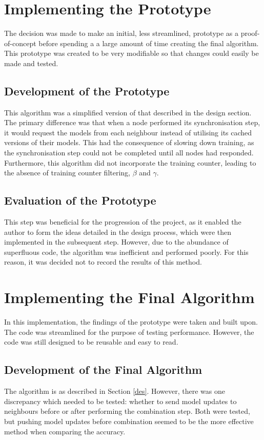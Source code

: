 \section{Implementing the Prototype}
The decision was made to make an initial, less streamlined, prototype as a proof-of-concept before spending a a large amount of time creating the final algorithm. This prototype was created to be very modifiable so that changes could easily be made and tested.

\subsection{Development of the Prototype} \label{reasonforcache}
This algorithm was a simplified version of that described in the design section. The primary difference was that when a node performed its synchronisation step, it would request the models from each neighbour instead of utilising its cached versions of their models. This had the consequence of slowing down training, as the synchronisation step could not be completed until all nodes had responded. Furthermore, this algorithm did not incorporate the training counter, leading to the absence of training counter filtering, $\beta$ and $\gamma$.

\subsection{Evaluation of the Prototype}
This step was beneficial for the progression of the project, as it enabled the author to form the ideas detailed in the design process, which were then implemented in the subsequent step. However, due to the abundance of superfluous code, the algorithm was inefficient and performed poorly. For this reason, it was decided not to record the results of this method.

\section{Implementing the Final Algorithm}
In this implementation, the findings of the prototype were taken and built upon. The code was streamlined for the purpose of testing performance. However, the code was still designed to be reusable and easy to read.

\subsection{Development of the Final Algorithm}
The algorithm is as described in Section \ref{des}. However, there was one discrepancy which needed to be tested: whether to send model updates to neighbours before or after performing the combination step. Both were tested, but pushing model updates before combination seemed to be the more effective method when comparing the accuracy. \\

